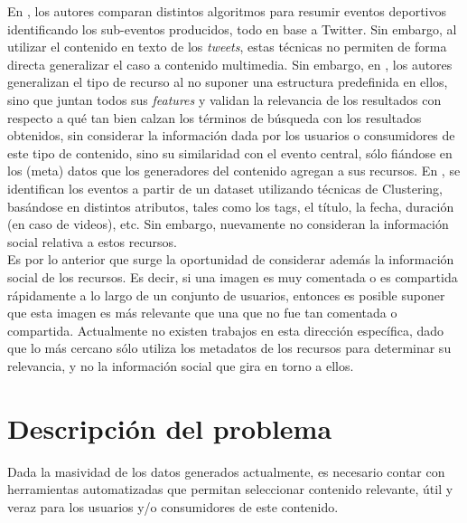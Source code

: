 \documentclass[11pt]{article}
\begin{document}
  En \cite{events}, los autores comparan distintos algoritmos para resumir eventos deportivos identificando los sub-eventos producidos, todo en base a Twitter. Sin embargo, al utilizar el contenido en texto de los \emph{tweets}, estas técnicas no permiten de forma directa generalizar el caso a contenido multimedia. Sin embargo, en \cite{concerts}, los autores generalizan el tipo de recurso al no suponer una estructura predefinida en ellos, sino que juntan todos sus \emph{features} y validan la relevancia de los resultados con respecto a qué tan bien calzan los términos de búsqueda con los resultados obtenidos, sin considerar la información dada por los usuarios o consumidores de este tipo de contenido, sino su similaridad con el evento central, sólo fiándose en los (meta) datos que los generadores del contenido agregan a sus recursos. En \cite{clusterers}, se identifican los eventos a partir de un dataset utilizando técnicas de Clustering, basándose en distintos atributos, tales como los tags, el título, la fecha, duración (en caso de videos), etc. Sin embargo, nuevamente no consideran la información social relativa a estos recursos.\\

  Es por lo anterior que surge la oportunidad de considerar además la información social de los recursos. Es decir, si una imagen es muy comentada o es compartida rápidamente a lo largo de un conjunto de usuarios, entonces es posible suponer que esta imagen es más relevante que una que no fue tan comentada o compartida. Actualmente no existen trabajos en esta dirección específica, dado que lo más cercano sólo utiliza los metadatos de los recursos para determinar su relevancia, y no la información social que gira en torno a ellos.

\newpage
\section{Descripción del problema}
\label{sec-2}


  Dada la masividad de los datos generados actualmente, es necesario contar con herramientas automatizadas que permitan seleccionar contenido relevante, útil y veraz para los usuarios y/o consumidores de este contenido.\\
\end{document}
